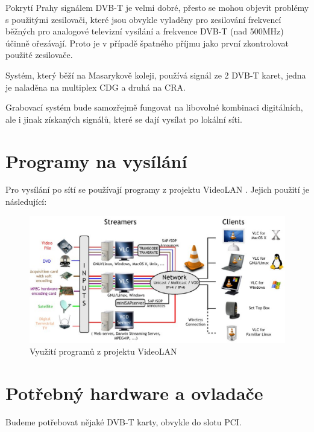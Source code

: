 Pokrytí Prahy signálem DVB-T je velmi dobré, přesto se mohou objevit problémy s použitými zesilovači, které jsou obvykle vyladěny pro zesilování frekvencí běžných pro analogové televizní vysílání a frekvence DVB-T (nad 500MHz) účinně ořezávají. Proto je v případě špatného příjmu jako první zkontrolovat použité zesilovače.

Systém, který běží na Masarykově koleji, používá signál ze 2 DVB-T karet, jedna je naladěna na multiplex CDG a druhá na CRA. 

Grabovací systém bude samozřejmě fungovat na libovolné kombinaci digitálních, ale i jinak získaných signálů, které se dají vysílat po lokální síti.

\section{Programy na vysílání}

\vspace{10pt}
Pro vysílání po sítí se používají programy z projektu VideoLAN \cite{videolanURL}. Jejich použití je následující:

\vspace{10pt}

\begin{figure}[h]
\begin{center}
\includegraphics[width=15cm]{images/videolan.eps}
\caption{Využití programů z projektu VideoLAN}
\label{fig:videolan}
\end{center}
\end{figure}

\vspace{10pt}

\section{Potřebný hardware a ovladače}
Budeme potřebovat nějaké DVB-T karty, obvykle do slotu PCI.

